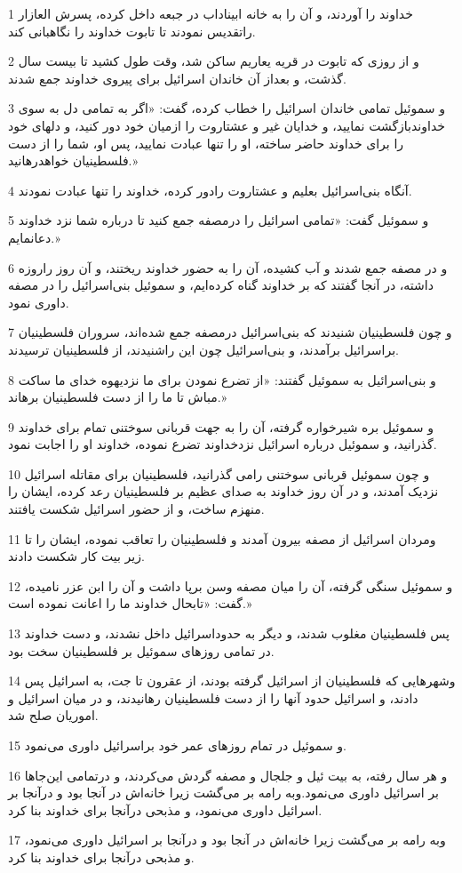 \par 1 خداوند را آوردند، و آن را به خانه ابیناداب در جبعه داخل کرده، پسرش العازار راتقدیس نمودند تا تابوت خداوند را نگاهبانی کند.
\par 2 و از روزی که تابوت در قریه یعاریم ساکن شد، وقت طول کشید تا بیست سال گذشت، و بعداز آن خاندان اسرائیل برای پیروی خداوند جمع شدند.
\par 3 و سموئیل تمامی خاندان اسرائیل را خطاب کرده، گفت: «اگر به تمامی دل به سوی خداوندبازگشت نمایید، و خدایان غیر و عشتاروت را ازمیان خود دور کنید، و دلهای خود را برای خداوند حاضر ساخته، او را تنها عبادت نمایید، پس او، شما را از دست فلسطینیان خواهدرهانید.»
\par 4 آنگاه بنی‌اسرائیل بعلیم و عشتاروت رادور کرده، خداوند را تنها عبادت نمودند.
\par 5 و سموئیل گفت: «تمامی اسرائیل را درمصفه جمع کنید تا درباره شما نزد خداوند دعانمایم.»
\par 6 و در مصفه جمع شدند و آب کشیده، آن را به حضور خداوند ریختند، و آن روز راروزه داشته، در آنجا گفتند که بر خداوند گناه کرده‌ایم، و سموئیل بنی‌اسرائیل را در مصفه داوری نمود. 
\par 7 و چون فلسطینیان شنیدند که بنی‌اسرائیل درمصفه جمع شده‌اند، سروران فلسطینیان براسرائیل برآمدند، و بنی‌اسرائیل چون این راشنیدند، از فلسطینیان ترسیدند.
\par 8 و بنی‌اسرائیل به سموئیل گفتند: «از تضرع نمودن برای ما نزدیهوه خدای ما ساکت مباش تا ما را از دست فلسطینیان برهاند.»
\par 9 و سموئیل بره شیرخواره گرفته، آن را به جهت قربانی سوختنی تمام برای خداوند گذرانید، و سموئیل درباره اسرائیل نزدخداوند تضرع نموده، خداوند او را اجابت نمود.
\par 10 و چون سموئیل قربانی سوختنی رامی گذرانید، فلسطینیان برای مقاتله اسرائیل نزدیک آمدند، و در آن روز خداوند به صدای عظیم بر فلسطینیان رعد کرده، ایشان را منهزم ساخت، و از حضور اسرائیل شکست یافتند.
\par 11 ومردان اسرائیل از مصفه بیرون آمدند و فلسطینیان را تعاقب نموده، ایشان را تا زیر بیت کار شکست دادند.
\par 12 و سموئیل سنگی گرفته، آن را میان مصفه وسن برپا داشت و آن را ابن عزر نامیده، گفت: «تابحال خداوند ما را اعانت نموده است.»
\par 13 پس فلسطینیان مغلوب شدند، و دیگر به حدوداسرائیل داخل نشدند، و دست خداوند در تمامی روزهای سموئیل بر فلسطینیان سخت بود.
\par 14 وشهرهایی که فلسطینیان از اسرائیل گرفته بودند، از عقرون تا جت، به اسرائیل پس دادند، و اسرائیل حدود آنها را از دست فلسطینیان رهانیدند، و در میان اسرائیل و اموریان صلح شد.
\par 15 و سموئیل در تمام روزهای عمر خود براسرائیل داوری می‌نمود.
\par 16 و هر سال رفته، به بیت ئیل و جلجال و مصفه گردش می‌کردند، و درتمامی این‌جاها بر اسرائیل داوری می‌نمود.وبه رامه بر می‌گشت زیرا خانه‌اش در آنجا بود و درآنجا بر اسرائیل داوری می‌نمود، و مذبحی درآنجا برای خداوند بنا کرد.
\par 17 وبه رامه بر می‌گشت زیرا خانه‌اش در آنجا بود و درآنجا بر اسرائیل داوری می‌نمود، و مذبحی درآنجا برای خداوند بنا کرد.
 
